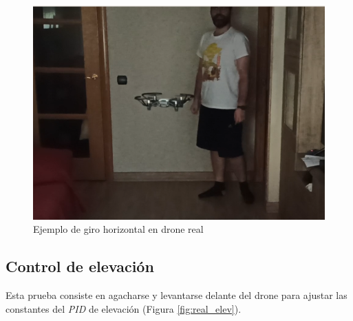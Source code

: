 \begin{figure}[!htb]
\endminipage\hfill
{}
    \includegraphics[width=\linewidth]{figures/real/giroR_3.png}
\endminipage\hfill
\caption{Ejemplo de giro horizontal en drone real}
\label{fig:real_giro}
\end{figure}
\subsection{Control de elevación}
Esta prueba consiste en agacharse y levantarse delante del drone para ajustar las constantes del \textit{PID} de elevación (Figura \ref{fig:real_elev}).

